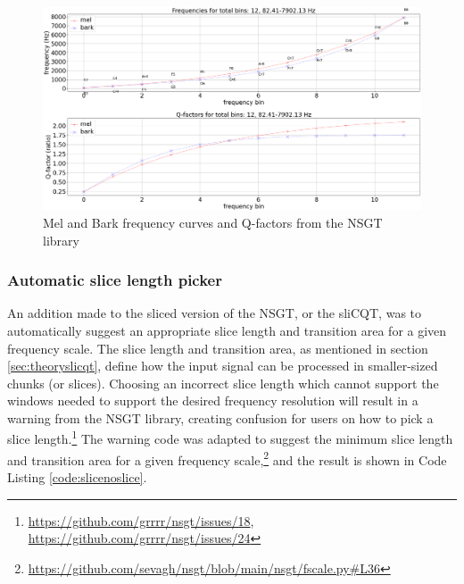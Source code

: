 \documentclass[report.tex]{subfiles}
\begin{document}
\begin{figure}[ht]
	\centering
	\includegraphics[width=\textwidth]{./images-freqscales/melbarkpitchesqs.png}
	\caption{Mel and Bark frequency curves and Q-factors from the NSGT library}
	\label{fig:melbarkfsandqs}
\end{figure}

\subsubsection{Automatic slice length picker}
\label{sec:autosllen}

An addition made to the sliced version of the NSGT, or the sliCQT, was to automatically suggest an appropriate slice length and transition area for a given frequency scale. The slice length and transition area, as mentioned in section \ref{sec:theoryslicqt}, define how the input signal can be processed in smaller-sized chunks (or slices). Choosing an incorrect slice length which cannot support the windows needed to support the desired frequency resolution will result in a warning from the NSGT library, creating confusion for users on how to pick a slice length.\footnote{\url{https://github.com/grrrr/nsgt/issues/18}, \url{https://github.com/grrrr/nsgt/issues/24}} The warning code was adapted to suggest the minimum slice length and transition area for a given frequency scale,\footnote{\url{https://github.com/sevagh/nsgt/blob/main/nsgt/fscale.py\#L36}} and the result is shown in Code Listing \ref{code:slicenoslice}.
\end{document}
